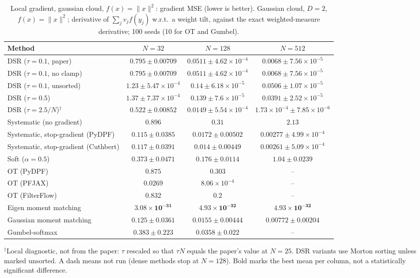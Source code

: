 \begin{table}[H]
\centering
\small
\caption{Local gradient, gaussian cloud, $f(x)=\|x\|^2$: gradient MSE (lower is better). Gaussian cloud, $D{=}2$, $f(x)=\|x\|^2$; derivative of $\sum_j v_j f(y_j)$ w.r.t.\ a weight tilt, against the exact weighted-measure derivative; 100 seeds (10 for OT and Gumbel).}
\label{tab:grad-gaussian-x2-squared_error_mean}
\begin{adjustbox}{max width=\linewidth}
\begin{tabular}{lccc}
\toprule
Method & $N{=}32$ & $N{=}128$ & $N{=}512$ \\
\midrule
DSR ($\tau{=}0.1$, paper) & $0.795\pm0.00709$ & $0.0511\pm4.62\times10^{-4}$ & $0.0068\pm7.56\times10^{-5}$ \\
DSR ($\tau{=}0.1$, no clamp) & $0.795\pm0.00709$ & $0.0511\pm4.62\times10^{-4}$ & $0.0068\pm7.56\times10^{-5}$ \\
DSR ($\tau{=}0.1$, unsorted) & $1.23\pm5.47\times10^{-4}$ & $0.14\pm6.18\times10^{-5}$ & $0.0506\pm1.07\times10^{-5}$ \\
DSR ($\tau{=}0.5$) & $1.37\pm7.37\times10^{-4}$ & $0.139\pm7.6\times10^{-5}$ & $0.0391\pm2.52\times10^{-5}$ \\
DSR ($\tau{=}2.5/N$)$^\dagger$ & $0.522\pm0.00852$ & $0.0149\pm5.54\times10^{-4}$ & $1.73\times10^{-4}\pm7.85\times10^{-6}$ \\
\midrule
Systematic (no gradient) & $0.896$ & $0.31$ & $2.13$ \\
Systematic, stop-gradient (PyDPF) & $0.115\pm0.0385$ & $0.0172\pm0.00502$ & $0.00277\pm4.99\times10^{-4}$ \\
Systematic, stop-gradient (Cuthbert) & $0.117\pm0.0391$ & $0.014\pm0.00449$ & $0.00261\pm5.09\times10^{-4}$ \\
Soft ($\alpha{=}0.5$) & $0.373\pm0.0471$ & $0.176\pm0.0114$ & $1.04\pm0.0239$ \\
OT (PyDPF) & $0.875$ & $0.303$ & -- \\
OT (PFJAX) & $0.0269$ & $8.06\times10^{-4}$ & -- \\
OT (FilterFlow) & $0.832$ & $0.2$ & -- \\
Eigen moment matching & $\mathbf{3.08\times10^{-31}}$ & $\mathbf{4.93\times10^{-32}}$ & $\mathbf{4.93\times10^{-32}}$ \\
Gaussian moment matching & $0.125\pm0.0361$ & $0.0155\pm0.00444$ & $0.00772\pm0.00204$ \\
Gumbel-softmax & $0.383\pm0.223$ & $0.0358\pm0.022$ & -- \\
\bottomrule
\end{tabular}
\end{adjustbox}
\par\smallskip\parbox{0.95\linewidth}{\footnotesize $^\dagger$Local diagnostic, not from the paper: $\tau$ rescaled so that $\tau N$ equals the paper's value at $N{=}25$. DSR variants use Morton sorting unless marked unsorted. A dash means not run (dense methods stop at $N{=}128$). Bold marks the best mean per column, not a statistically significant difference.}
\end{table}

